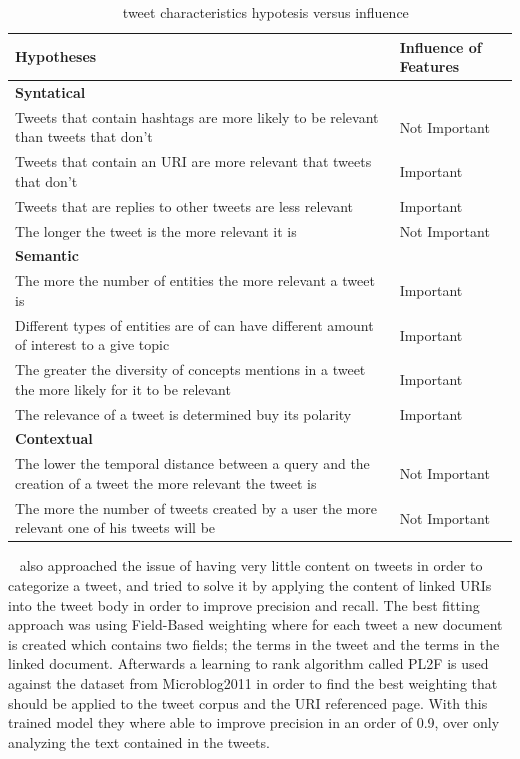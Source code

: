 \begin{table}[tb]
  \caption{~\citet{Tao2012} tweet characteristics hypotesis versus influence}
  \label{tab:tao_table}
  \begin{tabularx}{\textwidth}{|X|l|}
  \hline
  \textbf{Hypotheses} & \textbf{Influence of Features} \\
  \hline
  \hline

  {\bf Syntatical} &  \\
  \hline
  Tweets that contain hashtags are more likely to be relevant than tweets that don't & Not Important \\
  \hline
  Tweets that contain an URI are more relevant that tweets that don't  &Important \\
  \hline
  Tweets that are replies to other tweets are less relevant & Important \\
  \hline
  The longer the tweet is the more relevant it is & Not Important\\
  \hline
  \hline

  {\bf Semantic}  &  \\
  \hline
  
  The more the number of entities the more relevant a tweet is  & Important \\
  \hline
  Different types of entities are of can have different amount of interest to a give topic  & Important \\
  \hline
  The greater the diversity of concepts mentions in a tweet the more likely for it to be relevant & Important \\
  \hline
  The relevance of a tweet is determined buy its polarity & Important \\
  \hline
  \hline

  {\bf Contextual} &  \\
  \hline
  The lower the temporal distance between a query and the creation of a tweet the more relevant the tweet is  & Not Important \\
  \hline
  The more the number of tweets created by a user the more relevant one of his tweets will be & Not Important \\
  \hline
  \end{tabularx}
\end{table}

~\citet{McCreadie2013} also approached the issue of having very little content on tweets in order to categorize a tweet, and tried to solve it by applying the content of linked URIs into the tweet body in order to improve precision and recall. The best fitting approach was using Field-Based weighting where for each tweet a new document is created which contains two fields; the terms in the tweet and the terms in the linked document. 
Afterwards a learning to rank algorithm called PL2F is used against the dataset from Microblog2011 in order to find the best weighting that should be applied to the tweet corpus and the URI referenced page. 
With this trained model they where able to improve precision in an order of 0.9, over only analyzing the text contained in the tweets. 

